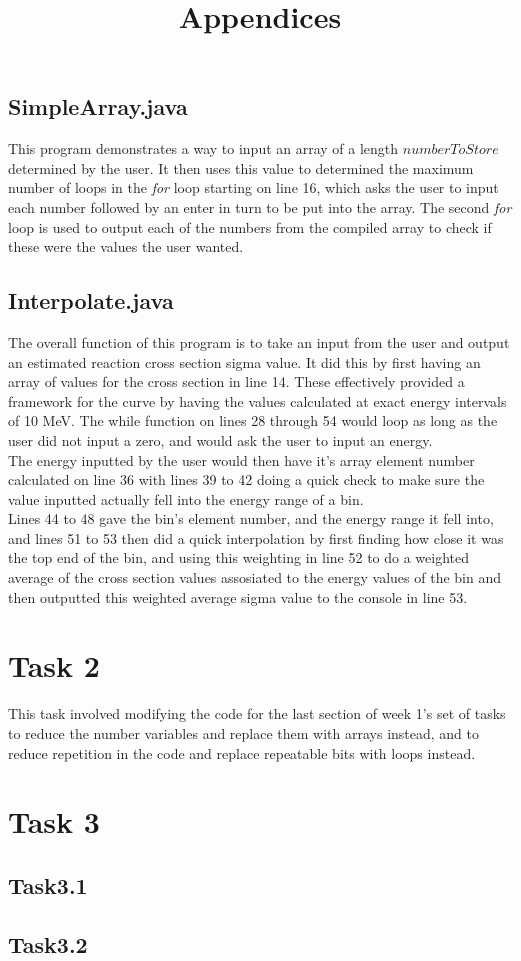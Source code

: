 \documentclass{article}
\begin{document}
\begin{multicols}{2}
		\subsection{SimpleArray.java}
			This program demonstrates a way to input an array of a length $numberToStore$ determined by the user. It then uses this value to determined the maximum number of loops in the \textit{for} loop starting on line 16, which asks the user to input each number followed by an enter in turn to be put into the array. The second \textit{for} loop is used to output each of the numbers from the compiled array to check if these were the values the user wanted.
		\subsection{Interpolate.java}
			The overall function of this program is to take an input from the user and output an estimated reaction cross section sigma value. It did this by first having an array of values for the cross section in line 14. These effectively provided a framework for the curve by having the values calculated at exact energy intervals of 10 MeV. The while function on lines 28 through 54 would loop as long as the user did not input a zero, and would ask the user to input an energy. \\ \indent The energy inputted by the user would then have it's array element number calculated on line 36 with lines 39 to 42 doing a quick check to make sure the value inputted actually fell into the energy range of a bin. \\ \indent Lines 44 to 48 gave the bin's element number, and the energy range it fell into, and lines 51 to 53 then did a quick interpolation by first finding how close it was the top end of the bin, and using this weighting in line 52 to do a weighted average of the cross section values assosiated to the energy values of the bin and then outputted this weighted average sigma value to the console in line 53.
	\section{Task 2}
		This task involved modifying the code for the last section of week 1's set of tasks to reduce the number variables and replace them with arrays instead, and to reduce repetition in the code and replace repeatable bits with loops instead.
	\section{Task 3}
		\subsection{Task3.1}
		\subsection{Task3.2}



\end{multicols}
\newpage


\title{Appendices}
\begin{center}

\begin{lstlisting}

\end{lstlisting}

\end{center}
\end{document}
